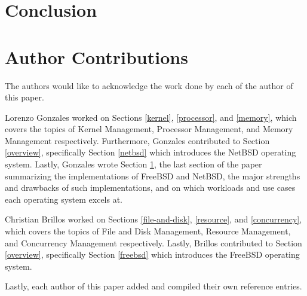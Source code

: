\documentclass{article}
\begin{document}
\newpage

\section{Conclusion} \label{conclusion}


\newpage

\section{Author Contributions}

The authors would like to acknowledge the work done by each of the author of this paper.

Lorenzo Gonzales worked on Sections \ref{kernel}, \ref{processor}, and \ref{memory},
which covers the topics of Kernel Management, Processor Management, and Memory Management
respectively. Furthermore, Gonzales contributed to Section \ref{overview}, specifically
Section \ref{netbsd} which introduces the NetBSD operating system. Lastly, Gonzales
wrote Section \ref{conclusion}, the last section of the paper summarizing the implementations
of FreeBSD and NetBSD, the major strengths and drawbacks of such implementations,
and on which workloads and use cases each operating system excels at.

Christian Brillos worked on Sections \ref{file-and-disk}, \ref{resource}, and \ref{concurrency},
which covers the topics of File and Disk Management, Resource Management, and Concurrency
Management respectively. Lastly, Brillos contributed to Section \ref{overview}, specifically
Section \ref{freebsd} which introduces the FreeBSD operating system.

Lastly, each author of this paper added and compiled their own reference entries.

\newpage
\printbibliography
\end{document}
